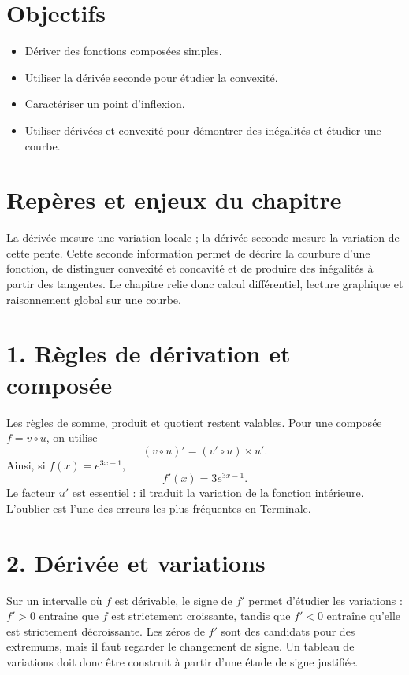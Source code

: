 
\section{Objectifs}
\begin{itemize}
\item Dériver des fonctions composées simples.
\item Utiliser la dérivée seconde pour étudier la convexité.
\item Caractériser un point d’inflexion.
\item Utiliser dérivées et convexité pour démontrer des inégalités et étudier une courbe.
\end{itemize}

\section{Repères et enjeux du chapitre}
La dérivée mesure une variation locale ; la dérivée seconde mesure la variation de cette pente. Cette seconde information permet de décrire la courbure d'une fonction, de distinguer convexité et concavité et de produire des inégalités à partir des tangentes. Le chapitre relie donc calcul différentiel, lecture graphique et raisonnement global sur une courbe.

\section{1. Règles de dérivation et composée}
Les règles de somme, produit et quotient restent valables. Pour une composée $f=v\circ u$, on utilise
\[
(v\circ u)'=(v'\circ u)\times u'.
\]
Ainsi, si $f(x)=e^{3x-1}$,
\[
f'(x)=3e^{3x-1}.
\]
Le facteur $u'$ est essentiel : il traduit la variation de la fonction intérieure. L'oublier est l'une des erreurs les plus fréquentes en Terminale.

\section{2. Dérivée et variations}
Sur un intervalle où $f$ est dérivable, le signe de $f'$ permet d'étudier les variations : $f'>0$ entraîne que $f$ est strictement croissante, tandis que $f'<0$ entraîne qu'elle est strictement décroissante. Les zéros de $f'$ sont des candidats pour des extremums, mais il faut regarder le changement de signe. Un tableau de variations doit donc être construit à partir d'une étude de signe justifiée.

